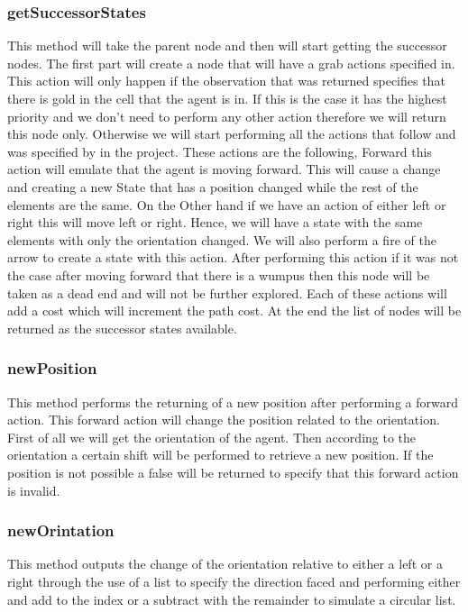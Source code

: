 		\subsubsection*{getSuccessorStates}
		This method will take the parent node and then will start getting the successor nodes. The first part will create a node that will have a grab actions specified in. This action will only happen if the observation that was returned specifies that there is gold in the cell that the agent is in. If this is the case it has the highest priority and we don't need to perform any other action therefore we will return this node only. Otherwise we will start performing all the actions that follow and was specified by in the project. These actions are the following, Forward this action will emulate that the agent is moving forward. This will cause a change and creating a new State that has a position changed while the rest of the elements are the same. On the Other hand if we have an action of either left or right this will move left or right. Hence, we will have a state with the same elements with only the orientation changed. We will also perform a fire of the arrow to create a state with this action. After performing this action if it was not the case after moving forward that there is a wumpus then this node will be taken as a dead end and will not  be further explored. Each of these actions will add a cost which will increment the path cost. At the end the list of nodes will be returned as the successor states available. 
		\subsubsection*{newPosition}
		This method performs the returning of a new position after performing a forward action. This forward action will change the position related to the orientation. First of all we will get the orientation of the agent. Then according to the orientation a certain shift will be performed to retrieve a new position. If the position is not possible a false will be returned to specify that this forward action is invalid.
		\subsubsection*{newOrintation}
		This method outputs the change of the orientation relative to either a left or a right through the use of a list to specify the direction faced and performing either and add to the index or a subtract with the remainder to simulate a circular list. 

